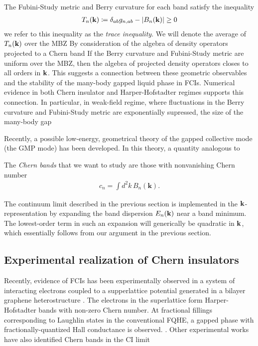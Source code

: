 \documentclass[aps,prb,twocolumn,letterpaper,twoside,nobalancelastpage,groupedaddress,amsmath,amssymb,floatfix,citeautoscript]{revtex4-1}
\begin{document}
The Fubini-Study metric and Berry curvature for each band satisfy the inequality
\begin{align*}
T_n({\bf k}) \coloneqq \delta_{ab}g_{n,ab} - |B_n({\bf k})| \geq 0
\end{align*}
we refer to this inequality as the \textit{trace inequality}.
We will denote the average of $T_n({\bf k})$ over the MBZ
 By consideration of the algebra of density operators projected to a Chern band
If the Berry curvature and Fubini-Study metric are uniform over the MBZ, then the algebra of projected density operators closes to all orders in ${\bf k}$. This suggests a connection between these geometric observables and the stability of the many-body gapped liquid phase in FCIs. Numerical evidence in both Chern insulator and Harper-Hofstadter regimes supports this connection. In particular, in weak-field regime, where fluctuations in the Berry curvature and Fubini-Study metric are exponentially supressed, the size of the many-body gap

Recently, a possible low-energy, geometrical theory of the gapped collective mode (the GMP mode) has been developed. In this theory, a quantity analogous to 

The \textit{Chern bands} that we want to study are those with nonvanishing Chern number 
\begin{align*}
c_n = \int d^2k\, B_n(\mathbf{k}).
\end{align*}


The continuum limit described in the previous section is implemented in the ${\bf k}$-representation by expanding the band dispersion $E_{n}({\bf k})$ near a band minimum. The lowest-order term in such an expansion will generically be quadratic in ${\bf k}$, which essentially follows from our argument in the previous section.



\subsection{Experimental realization of Chern insulators}
Recently, evidence of FCIs has been experimentally observed in a system of interacting electrons coupled to a supperlattice potential generated in a bilayer graphene heterostructure \cite{Spantoneaan8458}. The electrons in the superlattice form Harper-Hofstadter bands with non-zero Chern number. At fractional fillings corresponding to Laughlin states in the conventional FQHE, a gapped phase with fractionally-quantized Hall conductance is observed. \cite{Spantoneaan8458}. 
Other experimental works have also identified Chern bands in the CI limit  
\end{document}
